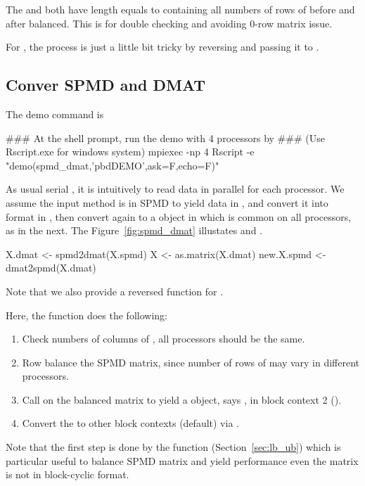 The  and  both have length equals to
 containing all numbers of rows of 
before and after balanced. This is for double checking and avoiding 0-row
matrix issue.

For , the process is just a little bit tricky by reversing
 and passing it to .




\subsection[Convert of SPMD and DMAT]{Conver SPMD and DMAT}
\label{sec:spmd_dmat}

The demo command is
\begin{Command}
### At the shell prompt, run the demo with 4 processors by
### (Use Rscript.exe for windows system)
mpiexec -np 4 Rscript -e "demo(spmd_dmat,'pbdDEMO',ask=F,echo=F)"
\end{Command}

As usual serial , it is intuitively to read data in parallel
for each processor. We assume the input method is in SPMD to yield
data in , and convert it into 
format in , then convert again to a 
object in  which is common on all processors, as in the next.
The Figure~\ref{fig:spmd_dmat} illustates  and .
\begin{Code}[title=R Code]
X.dmat <- spmd2dmat(X.spmd)
X <- as.matrix(X.dmat)
new.X.spmd <- dmat2spmd(X.dmat)
\end{Code}
Note that we also provide a reversed function  for
.

Here, the  function does the following:
\begin{enumerate}
\item Check numbers of columns of , all
      processors should be the same.
\item Row balance the SPMD matrix, since number of rows of
       may vary in different processors.
\item Call  on the balanced matrix to yield a  object,
      says , in block context 2 ().
\item Convert the  to other block contexts
      (default) via .
\end{enumerate}
Note that the first step is done by the  function
(Section~\ref{sec:lb_ub})
which is particular useful to balance SPMD matrix and yield performance
even the matrix is not in block-cyclic format.

